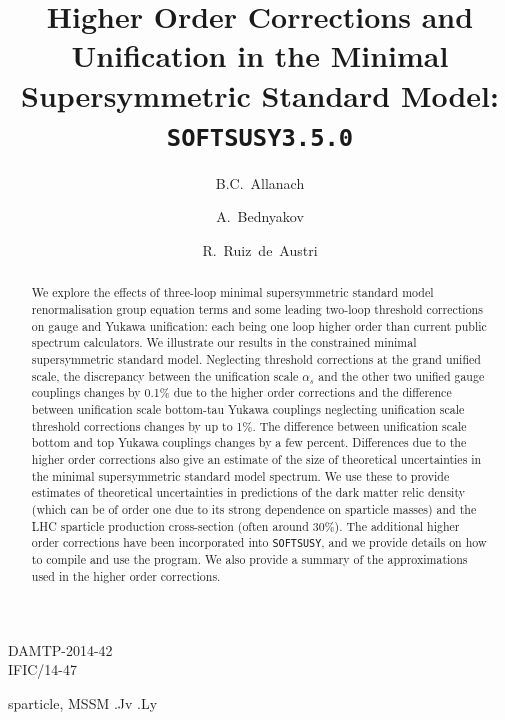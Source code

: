 \documentclass[final,3p,times,pdflatex]{elsarticle}
\begin{document}
\begin{frontmatter}

\begin{flushright}
DAMTP-2014-42\\
IFIC/14-47
\end{flushright}

\title{Higher Order Corrections and Unification in
  the Minimal Supersymmetric Standard Model: {\tt SOFTSUSY3.5.0}}

\author[damtp]{B.C.~Allanach}
\author[dubna]{A.~Bednyakov}
\author[valencia]{R.~Ruiz~de~Austri}

\address[damtp]{DAMTP, CMS, University of Cambridge, Wilberforce road,
  Cambridge, CB3  0WA, United Kingdom}
\address[dubna]{Joint Institute for Nuclear Research, 141980, Dubna, Russia}
\address[valencia]{Instituto de Física Corpuscular, IFIC-UV/CSIC, E-46980
  Paterna, Spain}  

\begin{abstract}
  We explore the effects of three-loop minimal supersymmetric standard
  model   renormalisation group equation terms and some leading two-loop
  threshold corrections on gauge and Yukawa
  unification: each being one loop higher order than 
  current public spectrum calculators.
  We illustrate our results in the constrained minimal supersymmetric standard
  model. Neglecting threshold corrections at the grand unified scale, the
  discrepancy between the unification scale
  $\alpha_s$ and 
  the other two unified gauge couplings changes by 0.1$\%$ due to the
  higher order 
  corrections and
  the difference between unification scale bottom-tau
  Yukawa couplings neglecting unification scale threshold
  corrections changes by up to 1$\%$. The difference between unification
  scale bottom and top Yukawa couplings changes by a few percent.
  Differences due to the higher order corrections also give an estimate of the
  size of theoretical uncertainties in the minimal supersymmetric standard
  model spectrum. We use these to 
  provide   estimates 
  of theoretical uncertainties in predictions of the dark matter relic density
  (which can be of order one due to its strong dependence on sparticle masses)
  and the LHC sparticle production cross-section (often around 30$\%$).
  The additional higher order corrections have been
  incorporated into {\tt SOFTSUSY}, and we provide details on how to
  compile and use the program. We also provide a summary of the
  approximations used in the higher order corrections. 
\end{abstract}

\begin{keyword}
sparticle, 
MSSM
.Jv
.Ly
\end{keyword}
\end{frontmatter}
\end{document}
